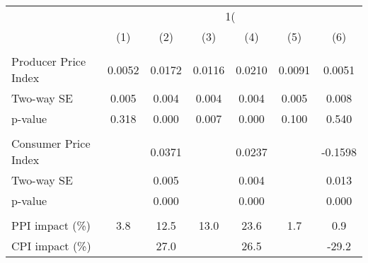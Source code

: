 {
\def\sym#1{\ifmmode^{#1}\else\(^{#1}\)\fi}
\begin{tabular}{l*{6}{c}}
\hline\hline
                    &&&\\\cmidrule(lr){2-3}\cmidrule(lr){4-5}\cmidrule(lr){6-7}
                    &         &         &         &         &         &         \\
\hline
\hline
\\ Producer Price Index&      0.0052         &      0.0172         &      0.0116         &      0.0210         &      0.0091         &      0.0051         \\
\hspace{15pt} Two-way SE&       0.005         &       0.004         &       0.004         &       0.004         &       0.005         &       0.008         \\
\hspace{25pt} p-value&       0.318         &       0.000         &       0.007         &       0.000         &       0.100         &       0.540         \\
\\ Consumer Price Index&                     &      0.0371         &                     &      0.0237         &                     &     -0.1598         \\
\hspace{15pt} Two-way SE&                     &       0.005         &                     &       0.004         &                     &       0.013         \\
\hspace{25pt} p-value&                     &       0.000         &                     &       0.000         &                     &       0.000         \\
\hline \\ PPI impact (\%)&         3.8         &        12.5         &        13.0         &        23.6         &         1.7         &         0.9         \\
CPI impact (\%)     &                     &        27.0         &                     &        26.5         &                     &       -29.2         \\

\end{tabular}}
